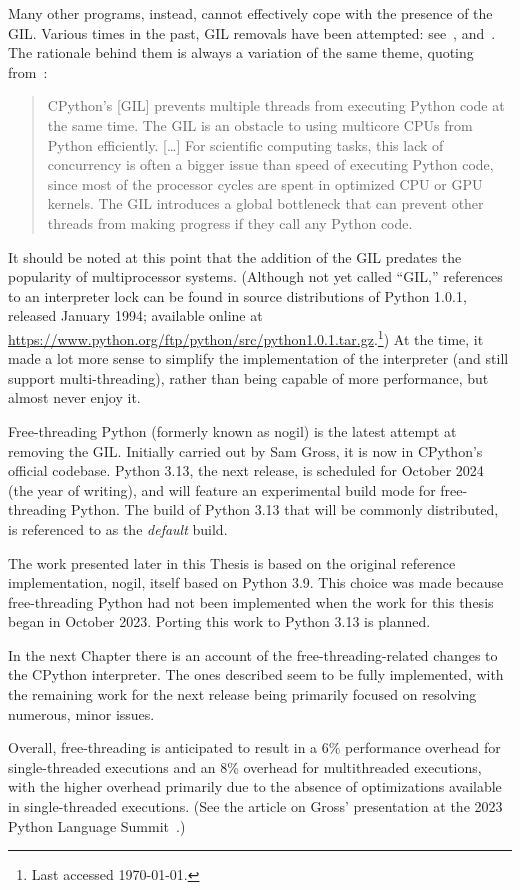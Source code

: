 Many other programs, instead, cannot effectively cope with the presence of the GIL\@.
Various times in the past, GIL removals have been attempted: see~\cite{dabeaz-gil}, and~\cite[\S Related Work]{pep703}.
The rationale behind them is always a variation of the same theme, quoting from~\cite{pep703}:
\begin{quote}
    CPython's [GIL] prevents multiple threads from executing Python code at the same time.
    The GIL is an obstacle to using multicore CPUs from Python efficiently.
    [\ldots] For scientific computing tasks, this lack of concurrency is often a bigger issue than speed of executing Python code, since most of the processor cycles are spent in optimized CPU or GPU kernels.
    The GIL introduces a global bottleneck that can prevent other threads from making progress if they call any Python code.
\end{quote}

It should be noted at this point that the addition of the GIL predates the popularity of multiprocessor systems.
(Although not yet called ``GIL,'' references to an interpreter lock can be found in source distributions of Python 1.0.1, released January 1994; available online at \url{https://www.python.org/ftp/python/src/python1.0.1.tar.gz}.\footnote{Last accessed \today.})
At the time, it made a lot more sense to simplify the implementation of the interpreter (and still support multi-threading), rather than being capable of more performance, but almost never enjoy it.

Free-threading Python (formerly known as nogil) is the latest attempt at removing the GIL\@.
Initially carried out by Sam Gross, it is now in CPython's official codebase.
Python 3.13, the next release, is scheduled for October 2024 (the year of writing), and will feature an experimental build mode for free-threading Python.
The build of Python 3.13 that will be commonly distributed, is referenced to as the \emph{default} build.

The work presented later in this Thesis is based on the original reference implementation, nogil, itself based on Python 3.9.
This choice was made because free-threading Python had not been implemented when the work for this thesis began in October 2023.
Porting this work to Python 3.13 is planned.

In the next Chapter there is an account of the free-threading-related changes to the CPython interpreter.
The ones described seem to be fully implemented, with the remaining work for the next release being primarily focused on resolving numerous, minor issues.

Overall, free-threading is anticipated to result in a 6\% performance overhead for single-threaded executions and an 8\% overhead for multithreaded executions, with the higher overhead primarily due to the absence of optimizations available in single-threaded executions.
(See the article on Gross' presentation at the 2023 Python Language Summit~\cite{python-summit-2023-nogil}.)
